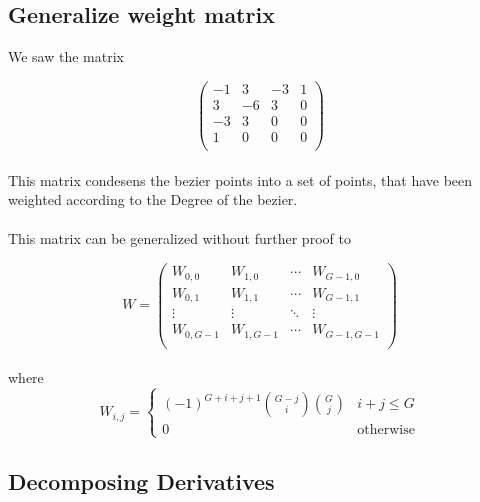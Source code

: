 \subsection{Generalize weight matrix}

We saw the matrix

\begin{equation*}
    \left(
    \begin{array}{cccc}
        -1 & 3  & -3 & 1 \\
        3  & -6 & 3  & 0 \\
        -3 & 3  & 0  & 0 \\
        1  & 0  & 0  & 0 \\
    \end{array}
    \right)
\end{equation*}
\\
This matrix condesens the bezier points into a set of points, that have been weighted according to the Degree of the bezier.
\\
\\
This matrix can be generalized without further proof to

\begin{equation*}
    W=
    \left(
    \begin{array}{cccc}
        W_{0,0}   & W_{1,0}   & \cdots & W_{G-1,0}   \\
        W_{0,1}   & W_{1,1}   & \cdots & W_{G-1,1}   \\
        \vdots    & \vdots    & \ddots & \vdots      \\
        W_{0,G-1} & W_{1,G-1} & \cdots & W_{G-1,G-1} \\
    \end{array}
    \right)
\end{equation*}
\\
where
\\
\begin{equation*}
    W_{i,j}=\begin{cases}
        (-1)^{G+i+j+1} {G-j \choose i} {G \choose j} & i + j \le G      \\
        0                                            & \text{otherwise}
    \end{cases}
\end{equation*}

\subsection{Decomposing Derivatives}

